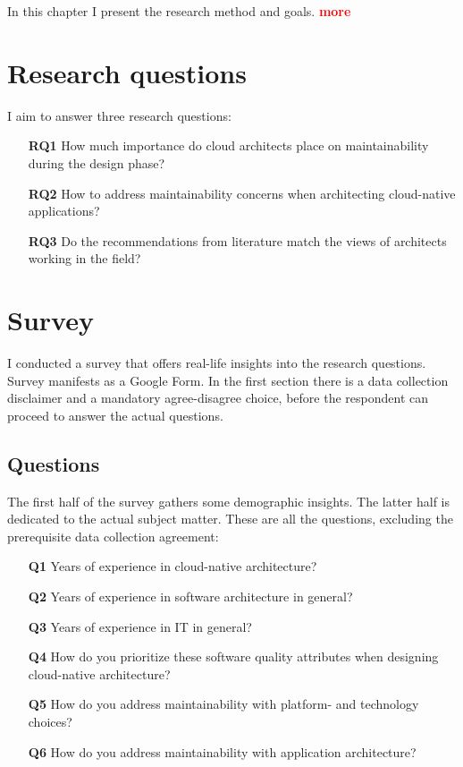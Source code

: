 \documentclass[utf8,english]{gradu3}
\newcommand{\todo}[1]{\textbf{\textcolor{red}{#1}}}
\begin{document}
In this chapter I present the research method and goals. \todo{more}

\section{Research questions}

I aim to answer three research questions:
\begin{itemize}
  \item [\textbf{RQ1}] How much importance do cloud architects place on maintainability during
        the design phase?
  \item [\textbf{RQ2}] How to address maintainability concerns when architecting cloud-native
        applications?
  \item [\textbf{RQ3}] Do the recommendations from literature match the views of architects
        working in the field?
\end{itemize}


\section{Survey}

I conducted a survey that offers real-life insights into the research questions.
Survey manifests as a Google Form.
In the first section there is a data collection disclaimer and a mandatory agree-disagree choice,
before the respondent can proceed to answer the actual questions.


\subsection{Questions}
The first half of the survey gathers some demographic insights.
The latter half is dedicated to the actual subject matter.
These are all the questions, excluding the prerequisite data collection agreement:
\begin{enumerate}
  \item [\textbf{Q1}] Years of experience in cloud-native architecture?
  \item [\textbf{Q2}] Years of experience in software architecture in general?
  \item [\textbf{Q3}] Years of experience in IT in general?
  \item [\textbf{Q4}] How do you prioritize these software quality attributes when designing cloud-native
        architecture?
  \item [\textbf{Q5}] How do you address maintainability with platform- and technology choices?
  \item [\textbf{Q6}] How do you address maintainability with application architecture?
\end{enumerate}
\end{document}
